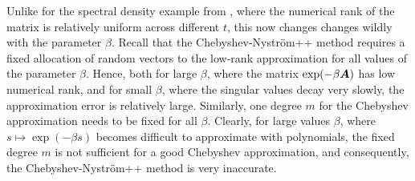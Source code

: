 Unlike for the spectral density example from , where the numerical rank of the matrix is relatively uniform across different $t$, this now changes changes wildly with the parameter $\beta$. Recall that the Chebyshev-Nyström++ method requires a fixed allocation of random vectors to the low-rank approximation for all values of the parameter $\beta$. Hence, both for large $\beta$, where the matrix $\exp(-\beta \boldsymbol{A})$ has low numerical rank, and for small $\beta$, where the singular values decay very slowly, the approximation error is relatively large. Similarly, one degree $m$ for the Chebyshev approximation needs to be fixed for all $\beta$. Clearly, for large values $\beta$, where $s \mapsto \exp(-\beta s)$ becomes difficult to approximate with polynomials, the fixed degree $m$ is not sufficient for a good Chebyshev approximation, and consequently, the Chebyshev-Nyström++ method is very inaccurate.
